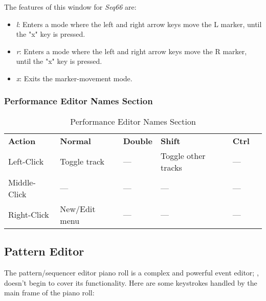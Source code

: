    The features of this window for \textsl{Seq66} are:

   \begin{itemize}
      \item \textsl{l}:  Enters a mode where the left and right arrow keys move
         the L marker, until the "x" key is pressed.
      \item \textsl{r}:  Enters a mode where the left and right arrow keys move
         the R marker, until the "x" key is pressed.
      \item \textsl{x}:  Exits the marker-movement  mode.
   \end{itemize}

\subsubsection{Performance Editor Names Section}
\label{subsubsec:kbd_mouse_performance_editor_names_section}

   \begin{table}[H]
      \centering
      \caption{Performance Editor Names Section}
      \label{table:performance_editor_names}
      \begin{tabular}{l l l l l l}
         \textbf{Action}   & \textbf{Normal}    & \textbf{Double}    & \textbf{Shift}        & \textbf{Ctrl}   \\
         Left-Click        & Toggle track       & ---                & Toggle other tracks   & ---             \\
         Middle-Click      & ---                & ---                & ---                   & ---             \\
         Right-Click       & New/Edit menu      & ---                & ---                   & ---             \\
      \end{tabular}
   \end{table}

\subsection{Pattern Editor}
\label{subsec:kbd_mouse_pattern_editor}

   The pattern/sequencer editor piano roll is a complex and powerful event
   editor;
   ,
   doesn't begin to cover its functionality.
   Here are some keystrokes handled by the main frame of the piano roll:

